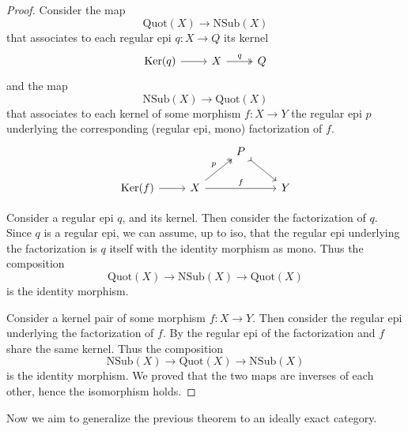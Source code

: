 \begin{subbox}{}
    \begin{proof}
    Consider the map 
    \[\mathrm{Quot}(X) \to \mathrm{NSub}(X)\]
    that associates to each regular epi $q:X \to Q$ its kernel
    \[
\begin{tikzcd}
\mathrm{Ker}(q) \arrow[r] & X \arrow[r, "q", two heads] & Q
\end{tikzcd}
\]
    and the map 
    \[\mathrm{NSub}(X) \to \mathrm{Quot}(X)\]
    that associates to each kernel of some morphism $f:X \to Y$ the regular epi $p$ underlying the corresponding (regular epi, mono) factorization of $f$.
    \[
\begin{tikzcd}
                          &                                              & P \arrow[rd, tail] &   \\
\mathrm{Ker}(f) \arrow[r] & X \arrow[rr, "f"] \arrow[ru, "p", two heads] &                    & Y
\end{tikzcd}
    \]

    Consider a regular epi $q$, and its kernel. Then consider the factorization of $q$. Since $q$ is a regular epi, we can assume, up to iso, that the regular epi underlying the factorization is $q$ itself with the identity morphism as mono. Thus the composition
    \[\mathrm{Quot}(X) \to \mathrm{NSub}(X) \to \mathrm{Quot}(X)\] is the identity morphism. 
    
    Consider a kernel pair of some morphism $f:X \to Y$. Then consider the regular epi underlying the factorization of $f$. By  the regular epi of the factorization and $f$ share the same kernel. Thus the composition
    \[\mathrm{NSub}(X) \to \mathrm{Quot}(X) \to \mathrm{NSub}(X)\]
    is the identity morphism.
    We proved that the two maps are inverses of each other, hence the isomorphism holds.
    \end{proof}
\end{subbox}

Now we aim to generalize the previous theorem to an ideally exact category.

